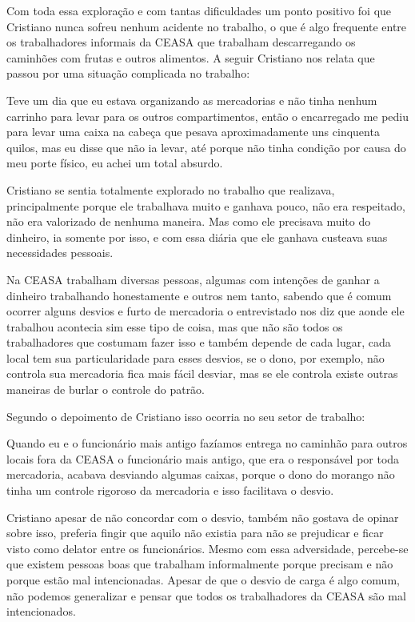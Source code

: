 Com toda essa exploração e com tantas dificuldades um ponto positivo foi que Cristiano nunca sofreu nenhum acidente no trabalho, o que é algo frequente entre os trabalhadores informais da CEASA que trabalham descarregando os caminhões com frutas e outros alimentos. A seguir Cristiano nos relata que passou por uma situação complicada no trabalho:

\begin{citacao}
Teve um dia que eu estava organizando as mercadorias e não tinha nenhum carrinho para levar para os outros compartimentos, então o encarregado me pediu para levar uma caixa na cabeça que pesava aproximadamente uns cinquenta quilos, mas eu disse que não ia levar, até porque não tinha condição por causa do meu porte físico, eu achei um total absurdo.
\end{citacao}

Cristiano se sentia totalmente explorado no trabalho que realizava, principalmente porque ele trabalhava muito e ganhava pouco, não era respeitado, não era valorizado de nenhuma maneira. Mas como ele precisava muito do dinheiro, ia somente por isso, e com essa diária que ele ganhava custeava suas necessidades pessoais.

Na CEASA trabalham diversas pessoas, algumas com intenções de ganhar a dinheiro trabalhando honestamente e outros nem tanto, sabendo que é comum ocorrer alguns desvios e furto de mercadoria o entrevistado nos diz que aonde ele trabalhou acontecia sim esse tipo de coisa, mas que não são todos os trabalhadores que costumam fazer isso e também depende de cada lugar, cada local tem sua particularidade para esses desvios, se o dono, por exemplo, não controla sua mercadoria fica mais fácil desviar, mas se ele controla existe outras maneiras de burlar o controle do patrão.

Segundo o depoimento de Cristiano isso ocorria no seu setor de trabalho:

\begin{citacao}
Quando eu e o funcionário mais antigo fazíamos entrega no caminhão para outros locais fora da CEASA o funcionário mais antigo, que era o responsável por toda mercadoria, acabava desviando algumas caixas, porque o dono do morango não tinha um controle rigoroso da mercadoria e isso facilitava o desvio.
\end{citacao}

Cristiano apesar de não concordar com o desvio, também não gostava de opinar sobre isso, preferia fingir que aquilo não existia para não se prejudicar e ficar visto como delator entre os funcionários. Mesmo com essa adversidade, percebe-se que existem pessoas boas que trabalham informalmente porque precisam e não porque estão mal intencionadas. Apesar de que o desvio de carga é algo comum, não podemos generalizar e pensar que todos os trabalhadores da CEASA são mal intencionados.

